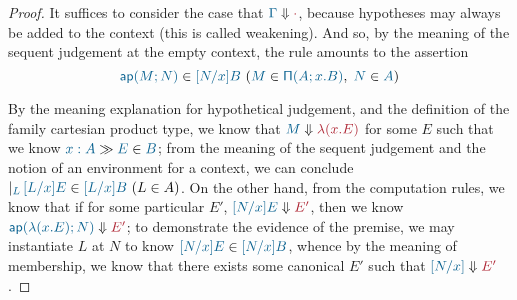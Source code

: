 \begin{proof}
It suffices to consider the case that $\reduce{\Gamma}{\cdot}$,
because hypotheses may always be added to the context (this is called
weakening). And so, by the meaning of the sequent judgement at the
empty context, the rule amounts to the assertion
\[
  \hyp{
    \ver{\ap{M}{N}}{[N/x]B}
  }{
    \ver{M}{\typrod{A}{x}{B}},\; \ver{N}{A}
  }
\]

By the meaning explanation for hypothetical judgement, and the definition of
the family cartesian product type, we know that $\reduce{M}{\lam{x}{E}}$ for
some $E$ such that we know $\sequent{x:A}{\ver{E}{B}}$; from the meaning of the
sequent judgement and the notion of an environment for a context, we can
conclude $\genj{L}{\hyp{\ver{[L/x]E}{[L/x]B}}{L\in A}}$. On the other hand,
from the computation rules, we know that if for some particular $E'$,
$\reduce{[N/x]E}{E'}$, then we know $\reduce{\ap{\lam{x}{E}}{N}}{E'}$; to
demonstrate the evidence of the premise, we may instantiate $L$ at $N$ to know
$\ver{[N/x]E}{[N/x]B}$, whence by the meaning of membership, we know that there
exists some canonical $E'$ such that $\reduce{[N/x]}{E'}$.

\end{proof}
